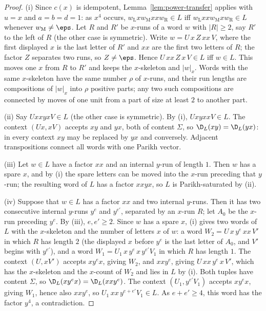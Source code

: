 \begin{proof}
(i) Since $c(x)$ is idempotent, Lemma~\ref{lem:power-transfer} applies with
$u=x$ and $a=b=d=1$: as $x^4$ occurs, $w_{\mathrm L}xw_{\mathrm M}xxw_{\mathrm R}\in L$ iff
$w_{\mathrm L}xxw_{\mathrm M}xw_{\mathrm R}\in L$ whenever $w_{\mathrm M}\ne\eps$.  Let $R$ and $R'$ be $x$-runs of a word $w$ with
$|R|\ge2$, say $R'$ to the left of $R$ (the other case is symmetric).  Write
$w=U\,x\,Z\,xx\,V$, where the first displayed $x$ is the last letter of $R'$ and
$xx$ are the first two letters of $R$; the factor $Z$ separates two runs, so
$Z\ne\eps$.  Hence $U\,xx\,Z\,x\,V\in L$ iff $w\in L$.  This moves one $x$ from $R$
to $R'$ and keeps the $x$-skeleton and $|w|_x$.  Words with the same
$x$-skeleton have the same number $\rho$ of $x$-runs, and their run lengths are
compositions of $|w|_x$ into $\rho$ positive parts; any two such compositions
are connected by moves of one unit from a part of size at least $2$ to another
part.

(ii) Say $UxxyxV\in L$ (the other case is symmetric).  By (i),
$UxyxxV\in L$.  The context $(Ux,xV)$ accepts $xy$ and $yx$, both of content
$\Sigma$, so $\D_L(xy)=\D_L(yx)$: in every context $xy$ may be replaced by $yx$
and conversely.  Adjacent transpositions connect all words with one Parikh
vector.

(iii) Let $w\in L$ have a factor $xx$ and an internal $y$-run of length $1$.
Then $w$ has a spare $x$, and by (i) the spare letters can be moved into the
$x$-run preceding that $y$-run; the resulting word of $L$ has a factor $xxyx$,
so $L$ is Parikh-saturated by (ii).

(iv) Suppose that $w\in L$ has a factor $xx$ and two internal $y$-runs.  Then it
has two consecutive internal $y$-runs $y^e$ and $y^{e'}$, separated by an
$x$-run $R$; let $A_0$ be the $x$-run preceding $y^e$.  By (iii), $e,e'\ge2$.
Since $w$ has a spare $x$, (i) gives two words of $L$ with the $x$-skeleton and
the number of letters $x$ of $w$: a word $W_2=U\,x\,y^e\,xx\,V'$ in which $R$ has
length $2$ (the displayed $x$ before $y^e$ is the last letter of $A_0$, and $V'$
begins with $y^{e'}$), and a word $W_1=U_1\,x\,y^e\,x\,y^{e'}V_1$ in which $R$ has
length $1$.  The context $(U,xV')$ accepts $xy^ex$, giving $W_2$, and $xxy^e$,
giving $U\,xx\,y^e\,x\,V'$, which has the $x$-skeleton and the $x$-count of $W_2$
and lies in $L$ by (i).  Both tuples have content $\Sigma$, so
$\D_L(xy^ex)=\D_L(xxy^e)$.  The context $(U_1,y^{e'}V_1)$ accepts $xy^ex$, giving
$W_1$, hence also $xxy^e$, so $U_1\,xx\,y^{e+e'}V_1\in L$.  As $e+e'\ge4$, this
word has the factor $y^4$, a contradiction.
\end{proof}

